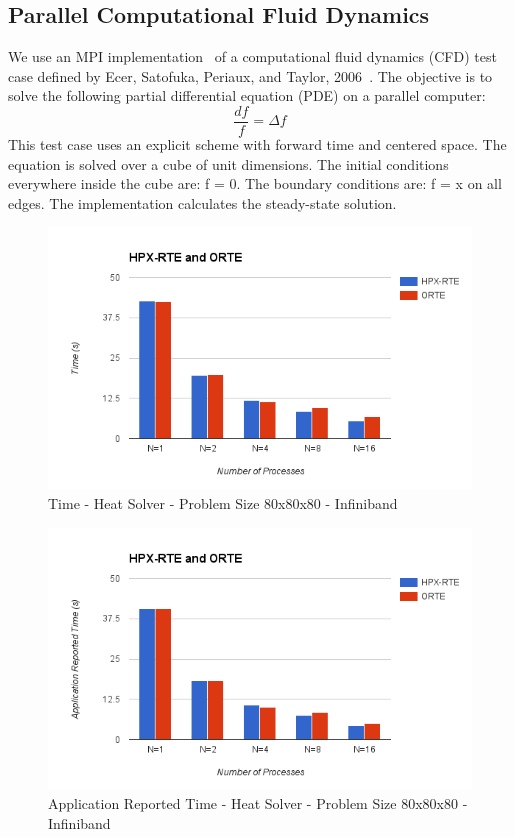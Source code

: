 \subsection{Parallel Computational Fluid Dynamics}
We use an MPI implementation~\cite{resch1999comparison} of a computational fluid dynamics (CFD) test case defined by Ecer, Satofuka, Periaux, and Taylor, 2006~\cite{ecer1996parallel}.
The objective is to solve the following partial differential equation (PDE) on a parallel computer:
\[
\frac{df}{f} = \Delta f
\]
This test case uses an explicit scheme with forward time and centered space. The equation is solved over a cube of unit dimensions. The initial conditions everywhere inside the cube are: f = 0. The boundary conditions are: f = x on all edges. The implementation calculates the steady-state solution.

\begin{figure}[h!]
\centering
\includegraphics[scale=0.7]{images/time-all-heatsolver-80-infiniband.png}
\caption[Application Reported Time - Hello World - Infiniband]{Time - Heat Solver - Problem Size 80x80x80 - Infiniband}
\label{fig:time-all-heatsolver-80-infiniband.png}
\end{figure}

\begin{figure}[h!]
\centering
\includegraphics[scale=0.7]{images/time-app-heatsolver-80-infiniband.png}
\caption[Application Reported Time - Hello World - Infiniband]{Application Reported Time - Heat Solver - Problem Size 80x80x80 - Infiniband}
\label{fig:time-app-heatsolver-80-infiniband.png}
\end{figure}

